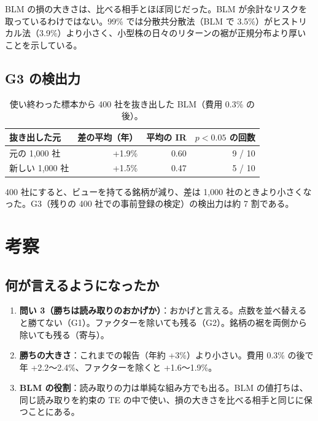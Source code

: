\documentclass[xelatex,ja=standard,jafont=haranoaji,a4paper,10pt,openany]{bxjsreport}
\begin{document}
BLM の損の大きさは、比べる相手とほぼ同じだった。BLM が余計なリスクを取っているわけではない。99\% では分散共分散法（BLM で 3.5\%）がヒストリカル法（3.9\%）より小さく、小型株の日々のリターンの裾が正規分布より厚いことを示している。

\section{G3 の検出力}

\begin{table}[H]
\centering\small
\caption{使い終わった標本から 400 社を抜き出した BLM（費用 0.3\% の後）。}
\label{tab:power}
\begin{tabular}{lrrr}
\toprule
抜き出した元 & 差の平均（年） & 平均の IR & $p < 0.05$ の回数 \\
\midrule
元の 1,000 社 & +1.9\% & 0.60 & 9 / 10 \\
新しい 1,000 社 & +1.5\% & 0.47 & 5 / 10 \\
\bottomrule
\end{tabular}
\end{table}

400 社にすると、ビューを持てる銘柄が減り、差は 1,000 社のときより小さくなった。G3（残りの 400 社での事前登録の検定）の検出力は約 7 割である。

\chapter{考察}\label{ch:discussion}

\section{何が言えるようになったか}

\begin{enumerate}
\item \textbf{問い 3（勝ちは読み取りのおかげか）}：おかげと言える。点数を並べ替えると勝てない（G1）。ファクターを除いても残る（G2）。銘柄の裾を両側から除いても残る（寄与）。
\item \textbf{勝ちの大きさ}：これまでの報告（年約 +3\%）より小さい。費用 0.3\% の後で年 +2.2〜2.4\%、ファクターを除くと +1.6〜1.9\%。
\item \textbf{BLM の役割}：読み取りの力は単純な組み方でも出る。BLM の値打ちは、同じ読み取りを約束の TE の中で使い、損の大きさを比べる相手と同じに保つことにある。
\end{enumerate}
\end{document}
